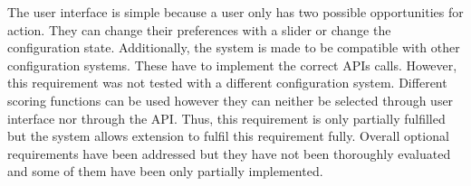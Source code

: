 The user interface is simple because a user only has two possible opportunities for action. They can change their preferences with a slider or change the configuration state. Additionally, the system is made to be compatible with other configuration systems. These have to implement the correct APIs calls. However, this requirement was not tested with a different configuration system. Different scoring functions can be used however they can neither be selected through user interface nor through the API. Thus, this requirement is only partially fulfilled but the system allows extension to fulfil this requirement fully.
Overall optional requirements have been addressed but they have not been thoroughly evaluated and some of them have been only partially implemented.